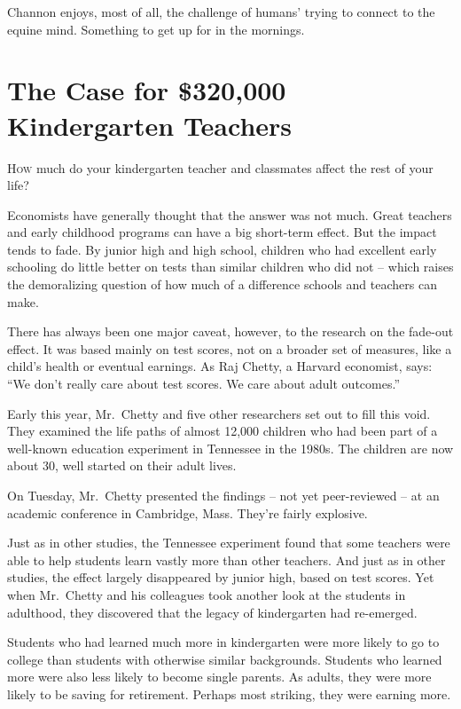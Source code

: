 ﻿\documentclass[12pt]{article}
\begin{document}
Channon enjoys, most of all, the challenge of humans' trying to connect to the equine mind.
Something to get up for in the mornings.

\section{The Case for \$320,000 Kindergarten Teachers}

\lettrine{H}{ow} much do your kindergarten teacher and classmates affect the
rest of your life?

Economists have generally thought that the answer was not much. Great teachers and early childhood
programs can have a big short-term effect. But the impact tends to fade. By junior high and high
school, children who had excellent early schooling do little better on tests than similar children
who did not -- which raises the demoralizing question of how much of a difference schools and
teachers can make.

There has always been one major caveat, however, to the research on the fade-out effect. It was
based mainly on test scores, not on a broader set of measures, like a child's health or eventual
earnings. As Raj Chetty, a Harvard economist, says: ``We don't really care about test scores. We
care about adult outcomes.''

Early this year, Mr.~Chetty and five other researchers set out to fill this void. They examined the
life paths of almost 12,000 children who had been part of a well-known education experiment in
Tennessee in the 1980s. The children are now about 30, well started on their adult lives.

On Tuesday, Mr.~Chetty presented the findings -- not yet peer-reviewed -- at an academic conference
in Cambridge, Mass. They're fairly explosive.

Just as in other studies, the Tennessee experiment found that some teachers were able to help
students learn vastly more than other teachers. And just as in other studies, the effect largely
disappeared by junior high, based on test scores. Yet when Mr.~Chetty and his colleagues took
another look at the students in adulthood, they discovered that the legacy of kindergarten had
re-emerged.

Students who had learned much more in kindergarten were more likely to go to college than students
with otherwise similar backgrounds. Students who learned more were also less likely to become single
parents. As adults, they were more likely to be saving for retirement. Perhaps most striking, they
were earning more.
\end{document}
